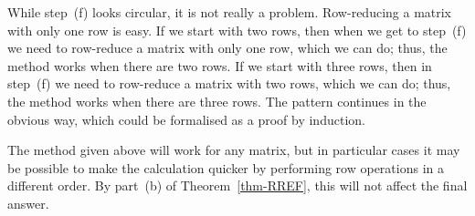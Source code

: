 \documentclass[reqno]{amsart}
\theoremstyle{definition}
\begin{document}
While step~(f) looks circular, it is not really a problem.
Row-reducing a matrix with only one row is easy.  If we start with two
rows, then when we get to step~(f) we need to row-reduce a matrix with
only one row, which we can do; thus, the method works when there are
two rows.  If we start with three rows, then in step~(f) we need to
row-reduce a matrix with two rows, which we can do; thus, the method
works when there are three rows.  The pattern continues in the obvious
way, which could be formalised as a proof by induction.

The method given above will work for any matrix, but in particular
cases it may be possible to make the calculation quicker by performing
row operations in a different order.  By part~(b) of
Theorem~\ref{thm-RREF}, this will not affect the final answer.
\end{document}
